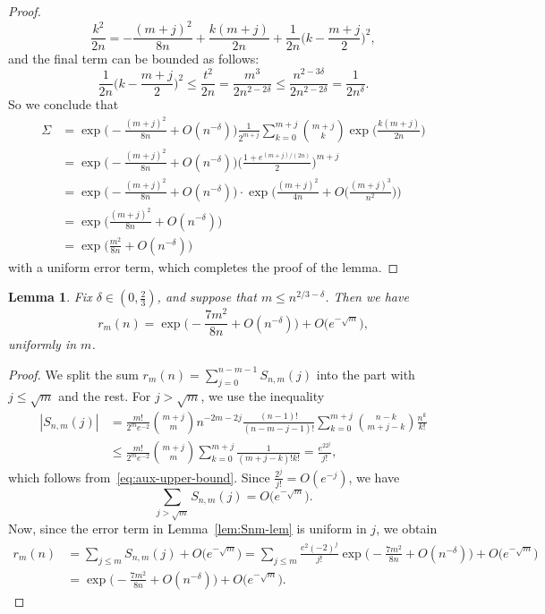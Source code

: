 \documentclass[a4paper,12pt,reqno]{amsart}
\newtheorem{lemma}{Lemma}
\theoremstyle{remark}
\newcommand{\gd}{\delta}
\begin{document}
\begin{proof}
\[\frac{k^2}{2n} = - \frac{(m+j)^2}{8n} + \frac{k(m+j)}{2n} + \frac{1}{2n} \Big( k - \frac{m+j}{2} \Big)^2,\]
and the final term can be bounded as follows:
\[\frac{1}{2n} \Big( k - \frac{m+j}{2} \Big)^2 \leq \frac{t^2}{2n} = \frac{m^3}{2n^{2-2\gd}} \leq \frac{n^{2-3\gd}}{2n^{2-2\gd}} = \frac{1}{2n^{\gd}}.\]
So we conclude that
\begin{align*}
\Sigma &= 
\exp \Big( {-} \frac{(m+j)^2}{8n} + O(n^{-\gd}) \Big)
\frac{1}{2^{m+j}} \sum_{k=0}^{m+j} \binom{m+j}{k} \exp \Big( \frac{k(m+j)}{2n} \Big) \\
&= \exp \Big( {-} \frac{(m+j)^2}{8n} + O(n^{-\gd}) \Big)
\Big( \frac{1 + e^{(m+j)/(2n)}}{2} \Big)^{m+j} \\
&= \exp \Big( {-} \frac{(m+j)^2}{8n} + O(n^{-\gd}) \Big) \cdot \exp \Big( \frac{(m+j)^2}{4n} + O \Big( \frac{(m+j)^3}{n^2} \Big) \Big) \\
&= \exp \Big( \frac{(m+j)^2}{8n} + O(n^{-\gd}) \Big) \\
&= \exp \Big( \frac{m^2}{8n} + O(n^{-\gd}) \Big)
\end{align*}
with a uniform error term, which completes the proof of the lemma.
\end{proof}

\begin{lemma}\label{lem:rm-lem}
Fix $\gd \in (0,\frac23)$, and suppose that $m \leq n^{2/3-\gd}$. Then we have
\[  r_m(n) = \exp \Big( {-}\frac{7m^2}{8n} + O(n^{-\gd}) \Big) + O\big(e^{-\sqrt{m}}\big),\]
uniformly in $m$.    
\end{lemma}

\begin{proof}
    We split the sum $r_m(n) = \sum_{j=0}^{n-m-1} S_{n,m}(j)$ into the part with $j \leq \sqrt{m}$ and the rest. For $j > \sqrt{m}$, we use the inequality
    \begin{align*}
|S_{n,m}(j)| &= \frac{m!}{2^m e^{-2}} \binom{m+j}{m} n^{-2m-2j} \frac{(n-1)!}{(n-m-j-1)!} \sum_{k=0}^{m+j} \binom{n-k}{m+j-k} \frac{n^k}{k!} \\
    &\leq \frac{m!}{2^m e^{-2}} \binom{m+j}{m} \sum_{k=0}^{m+j} \frac{1}{(m+j-k)!k!} = \frac{e^22^j}{j!},
    \end{align*}
which follows from~\eqref{eq:aux-upper-bound}. Since $\frac{2^j}{j!} = O(e^{-j})$, we have
\[\sum_{j > \sqrt{m}} S_{n,m}(j) = O \big( e^{-\sqrt{m}} \big).\]
Now, since the error term in Lemma~\ref{lem:Snm-lem} is uniform in $j$, we obtain
\begin{align*}
r_m(n) &= \sum_{j \leq m} S_{n,m}(j) + O \big( e^{-\sqrt{m}} \big) = \sum_{j \leq m} \frac{e^2(-2)^j}{j!} \exp \Big( {-}\frac{7m^2}{8n} + O(n^{-\gd}) \Big) + O \big( e^{-\sqrt{m}} \big) \\
&= \exp \Big( {-}\frac{7m^2}{8n} + O(n^{-\gd}) \Big) + O \big( e^{-\sqrt{m}} \big).
\end{align*} 
\end{proof}
\end{document}
